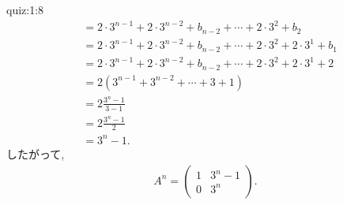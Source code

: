 \begin{answerof}{quiz:1:8}
\begin{align*}
    &=2\cdot 3^{n-1}+2\cdot 3^{n-2}+b_{n-2}+\cdots +2\cdot 3^{2}+b_2\\
    &=2\cdot 3^{n-1}+2\cdot 3^{n-2}+b_{n-2}+\cdots +2\cdot 3^{2}+2\cdot 3^1 +b_1\\
    &=2\cdot 3^{n-1}+2\cdot 3^{n-2}+b_{n-2}+\cdots +2\cdot 3^{2}+2\cdot 3^1 +2\\
    &=2(3^{n-1}+3^{n-2}+\cdots+3+1)\\
    &=2\frac{3^{n}-1}{3-1}\\
    &=2\frac{3^{n}-1}{2}\\
    &=3^{n}-1.
  \end{align*}
  したがって,
  \begin{align*}
    A^n=\begin{pmatrix}1&3^{n}-1\\0&3^n\end{pmatrix}.
  \end{align*}



\end{answerof}
